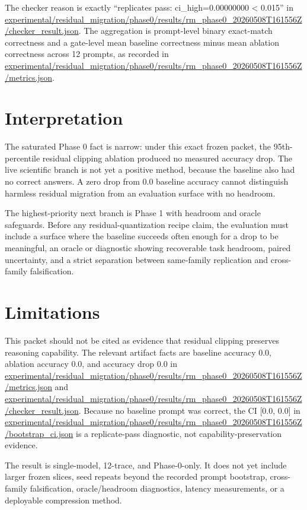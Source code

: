 \documentclass{article}
\begin{document}
The checker reason is exactly ``replicates pass: ci\_high=0.00000000 < 0.015''
in
\url{experimental/residual_migration/phase0/results/rm_phase0_20260508T161556Z/checker_result.json}.
The aggregation is prompt-level binary exact-match correctness and a
gate-level mean baseline correctness minus mean ablation correctness across 12
prompts, as recorded in
\url{experimental/residual_migration/phase0/results/rm_phase0_20260508T161556Z/metrics.json}.

\section{Interpretation}

The saturated Phase 0 fact is narrow: under this exact frozen packet, the
95th-percentile residual clipping ablation produced no measured accuracy drop.
The live scientific branch is not yet a positive method, because the baseline
also had no correct answers. A zero drop from 0.0 baseline accuracy cannot
distinguish harmless residual migration from an evaluation surface with no
headroom.

The highest-priority next branch is Phase 1 with headroom and oracle safeguards.
Before any residual-quantization recipe claim, the evaluation must include a
surface where the baseline succeeds often enough for a drop to be meaningful,
an oracle or diagnostic showing recoverable task headroom, paired uncertainty,
and a strict separation between same-family replication and cross-family
falsification.

\section{Limitations}

This packet should not be cited as evidence that residual clipping preserves
reasoning capability. The relevant artifact facts are baseline accuracy 0.0,
ablation accuracy 0.0, and accuracy drop 0.0 in
\url{experimental/residual_migration/phase0/results/rm_phase0_20260508T161556Z/metrics.json}
and
\url{experimental/residual_migration/phase0/results/rm_phase0_20260508T161556Z/checker_result.json}.
Because no baseline prompt was correct, the CI [0.0, 0.0] in
\url{experimental/residual_migration/phase0/results/rm_phase0_20260508T161556Z/bootstrap_ci.json}
is a replicate-pass diagnostic, not capability-preservation evidence.

The result is single-model, 12-trace, and Phase-0-only. It does not yet include
larger frozen slices, seed repeats beyond the recorded prompt bootstrap,
cross-family falsification, oracle/headroom diagnostics, latency measurements,
or a deployable compression method.
\end{document}
